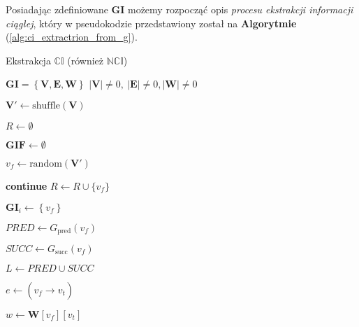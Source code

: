 Posiadając zdefiniowane $\mathbf{GI}$ możemy rozpocząć opis 
\textit{procesu ekstrakcji informacji ciągłej}, 
który w pseudokodzie przedstawiony został na \textbf{Algorytmie} (\ref{alg:ci_extractrion_from_g}).
\begin{algorithm}
    \caption{Ekstrakcja $\mathbb{CI}$ (również $\mathbb{NCI}$)}
    \label{alg:ci_extractrion_from_g}
    \begin{algorithmic}
        \Require $\mathbf{GI} = \left\{ \mathbf{V}, \mathbf{E}, \mathbf{W} \right\}$
        \Ensure $|\mathbf{V}| \neq 0, \: |\mathbf{E}| \neq 0, |\mathbf{W}| \neq 0$
        
        \State $\mathbf{V}' \gets \text{shuffle}(\mathbf{V})$
        
        \State $R \gets \emptyset$
        
        \State $\mathbf{GIF} \gets \emptyset$
        
            \State $v_f \gets \text{random}(\mathbf{V}')$
            
                \State \textbf{continue}
            \Else
                \State $R \gets R \cup \{ v_f \}$
            \EndIf

            \State $\mathbf{GI}_i \gets \left\{ v_f \right\}$

            \State $PRED \gets G_{\text{pred}}(v_{f})$
            
            \State $SUCC \gets G_{\text{succ}}(v_{f})$
            
            \State $L \gets PRED \cup SUCC$
            
                \State $e \gets (v_f \xrightarrow[]{} v_t)$
                
                \State $w \gets \mathbf{W}[v_f][v_t]$
                

\end{algorithmic}
\end{algorithm}

